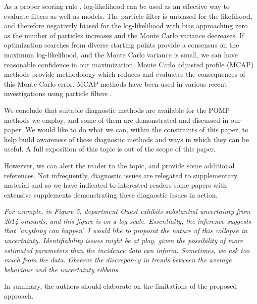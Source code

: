 \documentclass[11pt]{article}
\newcommand\report[1]{{\color{mygreen} \vspace{1mm}\hspace{0.25in}\parbox{6in}{\em #1}}}
\begin{document}
As a proper scoring rule \cite{gneiting07}, log-likelihood can be used as an effective way to evaluate filters as well as models. 
The particle filter is unbiased for the likelihood, and therefore negatively biased for the log-likelihood with bias approaching zero as the number of particles increases and the Monte Carlo variance decreases.
If optimization searches from diverse starting points provide a consensus on the maximum log-likelihood, and the Monte Carlo variance is small, we can have reasonable confidence in our maximization.
Monte Carlo adjusted profile (MCAP) methods \cite{ionides17,ning21} provide methodology which reduces and evaluates the consequences of this Monte Carlo error.
MCAP methods have been used in various recent investigations using particle filters \cite{subramanian21,ali22,pons-salort18}.

We conclude that suitable diagnostic methods are available for the POMP methods we employ, and some of them are demonstrated and discussed in our paper.
We would like to do what we can, within the constraints of this paper, to help build awareness of these diagnostic methods and ways in which they can be useful.
A full exposition of this topic is out of the scope of this paper.


Howerver, we can alert the reader to the topic, and provide some additional references.
Not infrequently, diagnostic issues are relegated to supplementary material and so we have indicated to interested readers some papers with extensive supplements demonstrating these diagnostic issues in action.

\report{
For example, in Figure 5, department Ouest exhibits substantial uncertainty from 2014 onwards, and this figure is on a log scale. Essentially, the inference suggests that 'anything can happen'. I would like to pinpoint the nature of this collapse in uncertainty. Identifiability issues might be at play, given the possibility of more estimated parameters than the incidence data can inform. Sometimes, we ask too much from the data. Observe the discrepancy in trends between the average behaviour and the uncertainty ribbons.

In summary, the authors should elaborate on the limitations of the proposed approach.
}
\end{document}
